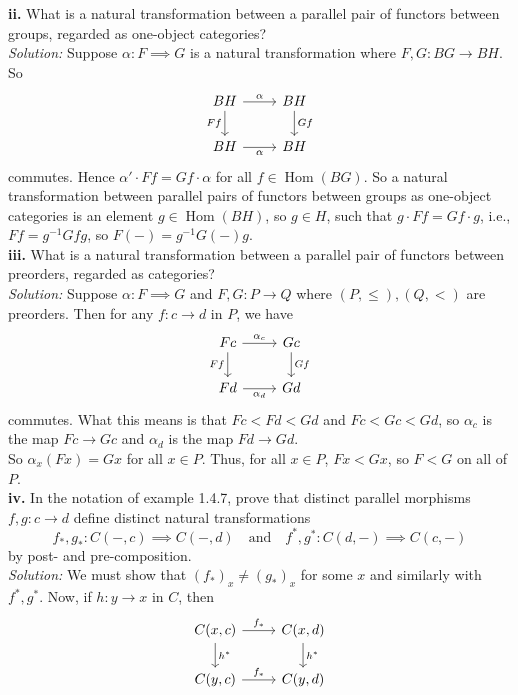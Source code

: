 \documentclass[a4paper]{article}
\theoremstyle{plain}%
\theoremstyle{definition}
\theoremstyle{remark}
\DeclareMathOperator{\Hom}{Hom}
\begin{document}
\textbf{ii.} What is a natural transformation between a parallel pair of
functors between groups, regarded as one-object categories?\\
\linebreak
\textit{Solution:} 
Suppose $\alpha  \colon F \implies G$ is a natural transformation where
$F,G  \colon BG \to BH$. 
So
\begin{equation*}
\begin{tikzcd}
    BH \ar[d, "Ff"'] \ar[r, "\alpha"] & BH \ar[d, "Gf"]\\
    BH \ar[r, "\alpha"'] & BH
\end{tikzcd}
\end{equation*}
commutes. Hence
$\alpha'\cdot  Ff = Gf \cdot \alpha $ for all $f \in \Hom(BG)$. So a natural transformation between
parallel pairs of functors between groups as one-object categories is
an element $g \in \Hom(BH)$, so $g \in H$, such that
$g \cdot Ff = Gf \cdot g$, i.e., $Ff = g^{-1} Gf g$, so
$F(-) = g^{-1} G(-) g$.\\
\linebreak
\textbf{iii.} What is a natural transformation between a parallel pair of
functors between preorders, regarded as categories?\\
\linebreak
\textit{Solution:} Suppose $\alpha  \colon F \implies G$ and
$F,G  \colon P \to Q$ where $(P,\le ), (Q,<)$ are preorders. Then
for any $f  \colon c \to d$ in $P$, we have
\begin{equation*}
\begin{tikzcd}
    Fc \ar[d, "Ff"'] \ar[r, "\alpha_c"] & Gc \ar[d, "Gf"]\\
    Fd \ar[r, "\alpha_d"'] & Gd
\end{tikzcd}
\end{equation*}
commutes. What this means is that
$Fc < Fd < Gd$ and $Fc < Gc < Gd$, so
$\alpha_c$ is the map $Fc \to Gc$ and
$\alpha_d$ is the map $Fd \to Gd$.\\
So $\alpha_x \left( Fx \right) = Gx$ for all $x \in P$. Thus, for all
$x \in P$, $Fx < Gx$, so $F < G$ on all of $P$.\\
\linebreak
\textbf{iv.} In the notation of example 1.4.7, prove that distinct parallel
morphisms $f, g  \colon c\to d$ define distinct natural transformations
\[
f_*, g_*  \colon C\left( -,c \right) \implies C(-,d) \quad
\text{and} \quad f^{*},g^{*}  \colon C(d,-) \implies C(c,-)
\] 
by post- and pre-composition.\\
\linebreak
\textit{Solution:} We must show that $(f_*)_{x} \neq (g_*)_{x}$ for some $x$
and similarly with $f^{*},g^{*}$. Now, if
$h  \colon y\to x$ in $C$, then
\begin{equation*}
\begin{tikzcd}
    C(x,c) \ar[r, "f_*"] \ar[d, "h^{*}"] & C(x,d) \ar[d, "h^{*}"]\\
    C(y,c) \ar[r, "f_*"] & C(y,d)
\end{tikzcd}
\end{equation*}
\end{document}
